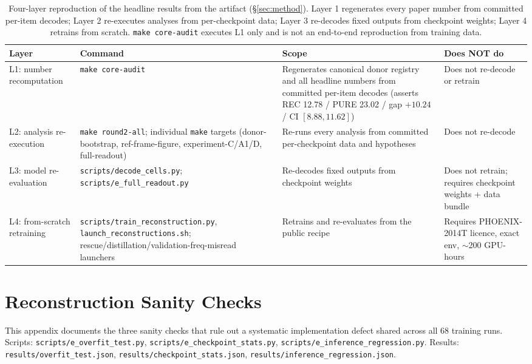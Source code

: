 \documentclass[pdflatex,sn-chicago]{sn-jnl}
\begin{document}
\begin{table}[h]
\centering
\scriptsize\setlength{\tabcolsep}{3pt}
\caption{Four-layer reproduction of the headline results from the artifact (\S\ref{sec:method}). Layer 1 regenerates every paper number from committed per-item decodes; Layer 2 re-executes analyses from per-checkpoint data; Layer 3 re-decodes fixed outputs from checkpoint weights; Layer 4 retrains from scratch. \texttt{make core-audit} executes L1 only and is not an end-to-end reproduction from training data.}
\label{tab:reproduction_layers}
\begin{tabular}{p{2.6cm}p{4.0cm}p{4.5cm}p{4.0cm}}
\toprule
Layer & Command & Scope & Does NOT do \\
\midrule
L1: number recomputation & \texttt{make core-audit} & Regenerates canonical donor registry and all headline numbers from committed per-item decodes (asserts REC 12.78 / PURE 23.02 / gap $+10.24$ / CI $[8.88, 11.62]$) & Does not re-decode or retrain \\
L2: analysis re-execution & \texttt{make round2-all}; individual \texttt{make} targets (donor-bootstrap, ref-frame-figure, experiment-C/A1/D, full-readout) & Re-runs every analysis from committed per-checkpoint data and hypotheses & Does not re-decode \\
L3: model re-evaluation & \texttt{scripts/decode\_cells.py}; \texttt{scripts/e\_full\_readout.py} & Re-decodes fixed outputs from checkpoint weights & Does not retrain; requires checkpoint weights + data bundle \\
L4: from-scratch retraining & \texttt{scripts/train\_reconstruction.py}, \texttt{launch\_reconstructions.sh}; rescue/distillation/validation-freq-misread launchers & Retrains and re-evaluates from the public recipe & Requires PHOENIX-2014T licence, exact env, $\sim$200 GPU-hours \\
\bottomrule
\end{tabular}
\end{table}

\section{Reconstruction Sanity Checks}
\label{sec:appendix_sanity}
This appendix documents the three sanity checks that rule out a systematic implementation defect shared across all 68 training runs. Scripts: \texttt{scripts/e\_overfit\_test.py}, \texttt{scripts/e\_checkpoint\_stats.py}, \texttt{scripts/e\_inference\_regression.py}. Results: \texttt{results/overfit\_test.json}, \texttt{results/checkpoint\_stats.json}, \texttt{results/inference\_regression.json}.
\end{document}

